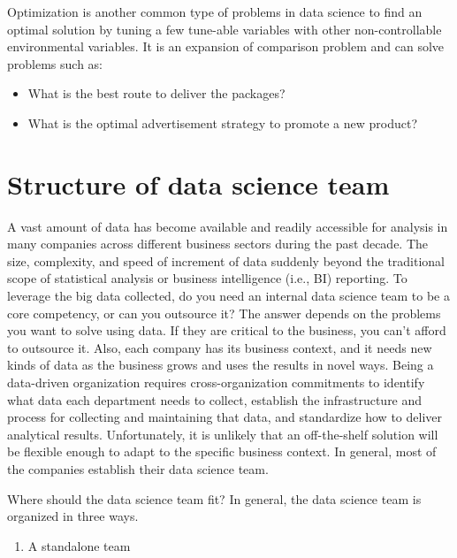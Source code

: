 \documentclass[
  12pt,
]{krantz}
\providecommand{\tightlist}{%
  \setlength{\itemsep}{0pt}\setlength{\parskip}{0pt}}
\begin{document}
Optimization is another common type of problems in data science to find an optimal solution by tuning a few tune-able variables with other non-controllable environmental variables. It is an expansion of comparison problem and can solve problems such as:

\begin{itemize}
\tightlist
\item
  What is the best route to deliver the packages?
\item
  What is the optimal advertisement strategy to promote a new product?
\end{itemize}

\hypertarget{structure-of-data-science-team}{%
\section{Structure of data science team}\label{structure-of-data-science-team}}

A vast amount of data has become available and readily accessible for analysis in many companies across different business sectors during the past decade. The size, complexity, and speed of increment of data suddenly beyond the traditional scope of statistical analysis or business intelligence (i.e., BI) reporting. To leverage the big data collected, do you need an internal data science team to be a core competency, or can you outsource it? The answer depends on the problems you want to solve using data. If they are critical to the business, you can't afford to outsource it. Also, each company has its business context, and it needs new kinds of data as the business grows and uses the results in novel ways. Being a data-driven organization requires cross-organization commitments to identify what data each department needs to collect, establish the infrastructure and process for collecting and maintaining that data, and standardize how to deliver analytical results. Unfortunately, it is unlikely that an off-the-shelf solution will be flexible enough to adapt to the specific business context. In general, most of the companies establish their data science team.

Where should the data science team fit? In general, the data science team is organized in three ways.

\begin{enumerate}
\def\labelenumi{(\arabic{enumi})}
\tightlist
\item
  A standalone team
\end{enumerate}
\end{document}
